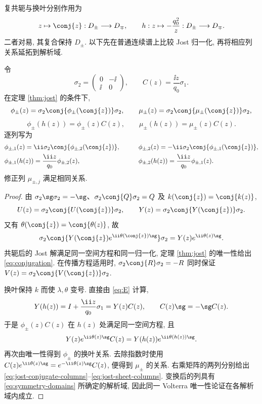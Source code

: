 复共轭与换叶分别作用为
\begin{equation}\label{eq:symmetry-domains}
z\mapsto\conj{z}:D_\pm\longrightarrow D_\mp,\qquad
h:z\mapsto-\dfrac{q_0^2}{z}:D_\pm\longrightarrow D_\mp.
\end{equation}
二者对易, 其复合保持 $D_\pm$. 以下先在普通连续谱上比较 Jost 归一化, 再将相应列关系延拓到解析域.

\begin{proposition}\label{prop:symmetry}
令
\[
\sigma_2=\begin{pmatrix}0&-\ii\\\ii&0\end{pmatrix},\qquad
C(z)=\dfrac{\ii z}{q_0}\sigma_1.
\]
在定理 \ref{thm:jost} 的条件下,
\begin{equation}\label{eq:conjugation}
\phi_\pm(z)=\sigma_2\conj{\phi_\pm(\conj{z})}\sigma_2,\qquad
\mu_\pm(z)=\sigma_2\conj{\mu_\pm(\conj{z})}\sigma_2,
\end{equation}
\begin{equation}\label{eq:musheet}
\phi_\pm(h(z))=\phi_\pm(z)C(z),\qquad
\mu_\pm(h(z))=\mu_\pm(z)C(z).
\end{equation}
逐列写为
\begin{alignat}{2}
&\phi_{\pm,1}(z)=\ii\sigma_2\conj{\phi_{\pm,2}(\conj{z})},&\qquad
&\phi_{\pm,2}(z)=-\ii\sigma_2\conj{\phi_{\pm,1}(\conj{z})},\label{eq:jost-conjugate-columns}\\
&\phi_{\pm,1}(h(z))=\dfrac{\ii z}{q_0}\phi_{\pm,2}(z),&\qquad
&\phi_{\pm,2}(h(z))=\dfrac{\ii z}{q_0}\phi_{\pm,1}(z).\label{eq:jost-sheet-columns}
\end{alignat}
修正列 $\mu_{\pm,j}$ 满足相同关系.
\end{proposition}
\begin{proof}
由 $\sigma_2\sg\sigma_2=-\sg$、$\sigma_2\conj{Q}\sigma_2=Q$ 及 $k(\conj{z})=\conj{k(z)}$,
\[
U(z)=\sigma_2\conj{U(\conj{z})}\sigma_2,\qquad
Y(z)=\sigma_2\conj{Y(\conj{z})}\sigma_2.
\]
又有 $\theta(\conj{z})=\conj{\theta(z)}$, 故
\[
\sigma_2\conj{Y(\conj{z})e^{\ii\theta(\conj{z})\sg}}\sigma_2
=Y(z)e^{\ii\theta(z)\sg}.
\]
共轭后的 Jost 解满足同一空间方程和同一归一化, 定理 \ref{thm:jost} 的唯一性给出 \eqref{eq:conjugation}. 在传播方程适用时, $\sigma_2\conj{R}\sigma_2=-R$ 同时保证 $V(z)=\sigma_2\conj{V(\conj{z})}\sigma_2$.

换叶保持 $k$ 而使 $\lambda,\theta$ 变号. 直接由 \eqref{eq:E} 计算,
\begin{equation}\label{eq:Esheet}
Y(h(z))=I+\dfrac{\ii z}{q_0}\sigma_1=Y(z)C(z),\qquad
C(z)\sg=-\sg C(z).
\end{equation}
于是 $\phi_\pm(z)C(z)$ 在 $h(z)$ 处满足同一空间方程, 且
\[
Y(z)e^{\ii\theta(z)\sg}C(z)
=Y(h(z))e^{\ii\theta(h(z))\sg}.
\]
再次由唯一性得到 $\phi_\pm$ 的换叶关系. 去除指数时使用
$C(z)e^{\ii\theta(z)\sg}=e^{-\ii\theta(z)\sg}C(z)$,
便得到 $\mu_\pm$ 的关系. 右乘矩阵的两列分别给出 \eqref{eq:jost-conjugate-columns}--\eqref{eq:jost-sheet-columns}. 变换后的列具有 \eqref{eq:symmetry-domains} 所确定的解析域, 因此同一 Volterra 唯一性论证在各解析域内成立.
\end{proof}

